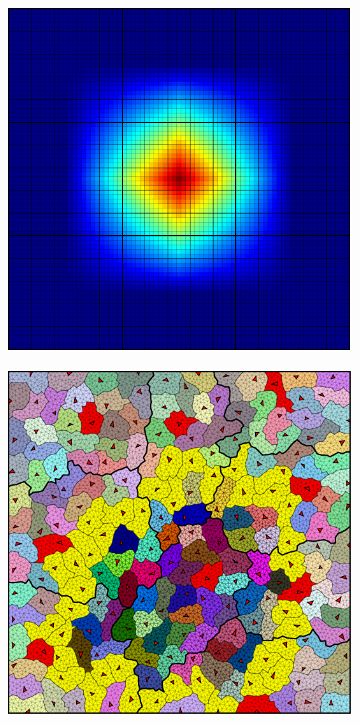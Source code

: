 \begin{figure}[htbp]
\begin{subfigure}[t]{0.3\textwidth}
  \end{subfigure}
  \hfill
  \begin{subfigure}[t]{0.3\textwidth}
    \centerline{\includegraphics[width=0.9\linewidth]{figs/square_cart_struct_cell_ml_lvl2_basis}}
  \end{subfigure}
  \par\bigskip
  \begin{subfigure}[t]{0.3\textwidth}
    \centerline{\includegraphics[width=0.9\linewidth]{figs/square_tria_metis_cell_ml_lvl1_grid}}

\end{subfigure}
\end{figure}
